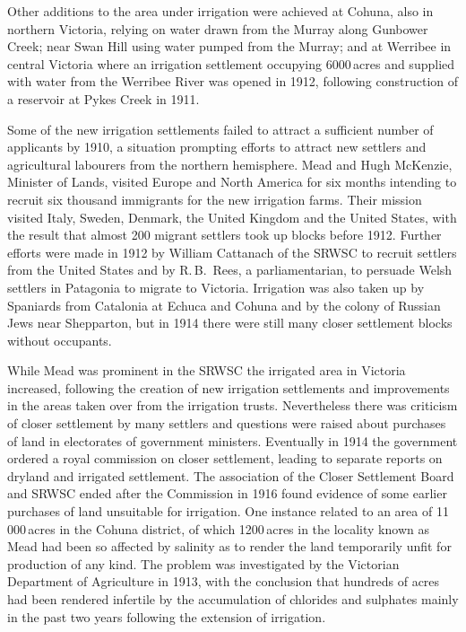 Other additions to the area under irrigation were achieved at Cohuna,
also in northern Victoria, relying on water drawn from the Murray
along Gunbower Creek; near Swan Hill using water pumped from the
Murray; and at Werribee in central Victoria where an irrigation
settlement occupying 6000\,acres and supplied with water from the
Werribee River was opened in 1912, following construction of a
reservoir at Pykes Creek in 1911.

Some of the new irrigation settlements failed to attract a sufficient
number of applicants by 1910, a situation prompting efforts to attract
new settlers and agricultural labourers from the northern hemisphere.
Mead and Hugh McKenzie, Minister of Lands, visited Europe and Nor\-th
America for six months intending to recruit six thousand immigrants
for the new irrigation farms. Their mission visited Italy, Sweden,
Denmark, the United Kingdom and the United States, with the result
that almost 200 migrant settlers took up blocks before 1912.  Further
efforts were made in 1912 by William Cattanach of the SRWSC to recruit
settlers from the United States and by R.\,B.~Rees, a parliamentarian,
to persuade Welsh settlers in Patagonia to migrate to Victoria.
Irrigation was also taken up by Spaniards from Catalonia at Echuca and
Cohuna and by the colony of Russian Jews near Shepparton, but in 1914
there were still many closer settlement blocks without occupants.

While Mead was prominent in the SRWSC the irrigated area in Victoria
increased, following the creation of new irrigation settlements and
improvements in the areas taken over from the irrigation trusts.
Nevertheless there was criticism of closer settlement by many settlers
and questions were raised about purchases of land in electorates of
government ministers.  Eventually in 1914 the government ordered a
royal commission on closer settlement, leading to separate reports on
dryland and irrigated settlement.  The association of the Closer
Settlement Board and SRWSC ended after the Commission in 1916 found
evidence of some earlier purchases of land unsuitable for irrigation.
One instance related to an area of 11\,000\,acres in the Cohuna
district, of which 1200\,acres in the locality known as Mead had been
so affected by salinity  as to render the land
temporarily unfit for production of any kind.  The problem was
investigated by the Victorian Department of Agriculture in 1913, with
the conclusion that hundreds of acres had been rendered infertile by
the accumulation of chlorides and sulphates mainly in the past two
years following the extension of irrigation.

